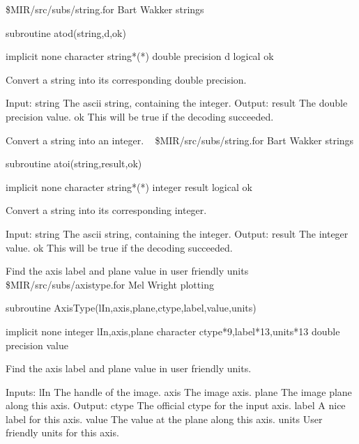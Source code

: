 \newline {} \$MIR/src/subs/string.for
\newline {} Bart Wakker
\newline {} strings
\par{\tenpoint
{\eightpoint\begintt
        subroutine atod(string,d,ok)

        implicit none
        character string*(*)
        double precision d
        logical ok

  Convert a string into its corresponding double precision.

  Input:
    string     The ascii string, containing the integer.
  Output:
    result     The double precision value.
    ok         This will be true if the decoding succeeded.
\endtt}
\par}
%
\noindent Convert a string into an integer.
\newline \ 
\newline {} \$MIR/src/subs/string.for
\newline {} Bart Wakker
\newline {} strings
\par{\tenpoint
{\eightpoint\begintt
        subroutine atoi(string,result,ok)

        implicit none
        character string*(*)
        integer result
        logical ok

  Convert a string into its corresponding integer.

  Input:
    string     The ascii string, containing the integer.
  Output:
    result     The integer value.
    ok         This will be true if the decoding succeeded.
\endtt}
\par}
%
\noindent Find the axis label and plane value in user friendly units
\newline \ 
\newline \abox{File:} \$MIR/src/subs/axistype.for
\newline {} Mel Wright
\newline \abox{Keywords:} plotting
\par{\tenpoint
{\eightpoint\begintt
        subroutine AxisType(lIn,axis,plane,ctype,label,value,units)

        implicit none
        integer lIn,axis,plane
        character ctype*9,label*13,units*13
        double precision value

 Find the axis label and plane value in user friendly units.

  Inputs:
    lIn        The handle of the image.
    axis       The image axis.
    plane      The image plane along this axis.
  Output:
    ctype      The official ctype for the input axis.
    label      A nice label for this axis.
    value      The value at the plane along this axis.
    units      User friendly units for this axis.
\endtt}
\par}

